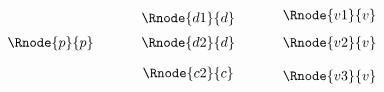 $
\begin{array}{cp{0.5cm}cp{0.5cm}c}
               &  &                  & &     \Rnode{v1}{v}  \\[-0.35cm]
               &  &   \Rnode{d1}{d}  & &                    \\[0.2cm]
\Rnode{p}{p}   &  &   \Rnode{d2}{d}  & &     \Rnode{v2}{v}  \\[0.35cm]
               &  &   \Rnode{c2}{c}  & &                    \\[-0.35cm]
               &  &                  & &     \Rnode{v3}{v}
\end{array}
$
\idcomp 
{}
\idcomp
{}
\idcomp 
{}
\idcomp
{}
\idcomp 
{} 
\idcomp